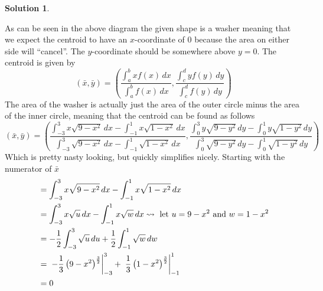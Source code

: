 \documentclass[10pt]{article}
\theoremstyle{definition}
\newtheorem{soln}{Solution}
\begin{document}
\begin{soln}
\begin{center}
    \end{center}
    \noindent As can be seen in the above diagram the given shape is a washer meaning that we expect the centroid to have an $x$-coordinate of $0$ because the area on either side will ``cancel''.
    The $y$-coordinate should be somewhere above $y=0$. The centroid is given by
    $$(\bar{x}, \bar{y})=\left(\frac{\int_{a}^{b} xf(x)\, dx}{\int_{a}^{b} f(x)\, dx}, \frac{\int_{c}^{d} yf(y)\, dy}{\int_{c}^{d} f(y)\, dy}\right)$$
    \noindent The area of the washer is actually just the area of the outer circle minus the area of the inner circle, meaning that the centroid can be found as follows
    $$(\bar{x}, \bar{y})=\left(\frac{\int_{-3}^{3} x\sqrt{9-x^{2}}\, dx - \int_{-1}^{1} x\sqrt{1-x^{2}}\, dx}{\int_{-3}^{3} \sqrt{9-x^{2}}\, dx - \int_{-1}^{1} \sqrt{1-x^{2}}\, dx}, \frac{\int_{0}^{3} y\sqrt{9-y^{2}}\, dy - \int_{0}^{1} y\sqrt{1-y^{2}}\, dy}{\int_{0}^{3} \sqrt{9-y^{2}}\, dy - \int_{0}^{1} \sqrt{1-y^{2}}\, dy}\right)$$
    \noindent Which is pretty nasty looking, but quickly simplifies nicely. Starting with the numerator of $\bar{x}$
    \begin{align*}
         & = \int_{-3}^{3} x\sqrt{9-x^{2}}\, dx - \int_{-1}^{1} x\sqrt{1-x^{2}}\, dx                                                      \\
         & = \int_{-3}^{3} x\sqrt{u}\, dx - \int_{-1}^{1} x\sqrt{w}\, dx \rightsquigarrow \text{ let } u=9-x^2 \text { and } w=1-x^2      \\
         & = -\frac{1}{2}\int_{-3}^{3} \sqrt{u}\, du + \frac{1}{2}\int_{-1}^{1} \sqrt{w}\, dw                                             \\
         & = \eval*{-\frac{1}{3}\left(9-x^2\right)^{\frac{3}{2}}}_{-3}^{3} + \eval*{\frac{1}{3}\left(1-x^2\right)^{\frac{3}{2}}}_{-1}^{1} \\
         & = 0                                                                                                                            \\
    \end{align*}


\end{soln}
\end{document}
